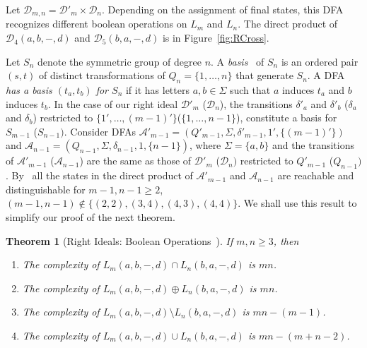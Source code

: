 \documentclass[final]{dmtcs-episciences}
\renewcommand{\ge}{\geqslant}
\newcommand{\Sig}{\Sigma}
\newcommand{\be}{\begin{enumerate}}
\newcommand{\ee}{\end{enumerate}}
\newcommand{\cA}{{\mathcal A}}
\newcommand{\cD}{{\mathcal D}}
\newtheorem{theorem}{Theorem}
\theoremstyle{definition}
\theoremstyle{remark}
\begin{document}
Let $\cD_{m,n} = \cD'_m \times \cD_n$.
Depending on the assignment of final states, this DFA recognizes different boolean operations on $L_m$ and $L_n$.
The 
direct product  of $\cD_4(a,b,-,d)$ and  $\cD_5(b,a,-,d)$ is  in
Figure~\ref{fig:RCross}.  





Let $S_n$ denote the symmetric group of degree $n$. 
A \emph{basis}~\cite{Pic39} of $S_n$
is an ordered pair $(s,t)$ of distinct transformations of $Q_n=\{1,\dots,n\}$ that generate $S_n$.
A DFA \emph{has a basis $(t_a,t_b)$ for $S_n$} if it has letters $a,b\in \Sig$ such that $a$ induces $t_a$ and $b$ induces $t_b$.
In the case of our right ideal $\cD'_m$ ($\cD_n$), the transitions $\delta'_a$ and $\delta'_b$ ($\delta_a$ and $\delta_b$) restricted to $\{1',\dots,(m-1)'\}$($\{1,\dots,n-1\}$), constitute a basis for $S_{m-1}$ ($S_{n-1})$. 
Consider DFAs 
$\cA'_{m-1}=(Q'_{m-1},\Sig,\delta'_{m-1},1',\{(m-1)'\})$ and 
$\cA_{n-1}=(Q_{n-1},\Sig,\delta_{n-1}, 1, \{n-1\})$, where $\Sig=\{a,b\}$ and the transitions of $\cA'_{m-1}$ ($\cA_{n-1}$) are the same as those of $\cD'_m$ ($\cD_n)$ restricted to $Q'_{m-1}$ ($Q_{n-1})$.
By~\cite[Theorem 1]{BBMR14} all the states in the direct product of 
$\cA'_{m-1}$  and $\cA_{n-1}$ are reachable and distinguishable for 
$m-1,n-1\ge 2$,  $(m-1,n-1)\not \in \{(2,2), (3,4),(4,3),(4,4)\}$.
We shall use this result to simplify our proof of the next theorem.

\begin{theorem}[Right Ideals: Boolean Operations~\cite{BrDa14}]
\label{thm:RBool}
If $m,n\ge 3$, then
\be
\item
The complexity of $L_m(a,b,-,d) \cap L_n(b,a,-,d)$ is $mn$.
\item
The complexity of $L_m(a,b,-,d) \oplus L_n(b,a,-,d)$ is $mn$.
\item
The complexity of $L_m(a,b,-,d) \setminus L_n(b,a,-,d)$ is $mn-(m-1)$.
\item
The complexity of $L_m(a,b,-,d) \cup L_n(b,a,-,d)$ is $mn-(m+n-2)$.
\ee
\end{theorem}
\end{document}
